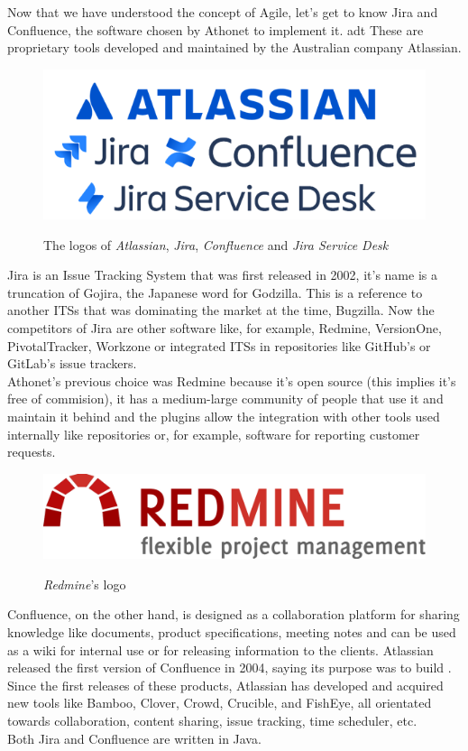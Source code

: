 	Now that we have understood the concept of Agile, let's get to know Jira and Confluence, the software chosen by Athonet to implement it. \gls{adt}
	These are proprietary tools developed and maintained by the Australian company Atlassian.
	\begin{figure}[H]
		\centering
		\includegraphics[width=.7\textwidth]{resources/atlassian_logo}\\
		\caption{The logos of \textit{Atlassian}, \textit{Jira}, \textit{Confluence} and \textit{Jira Service Desk}}
	\end{figure}
	Jira is an Issue Tracking System that was first released in 2002, it's name is a truncation of Gojira, the Japanese word for Godzilla.
	This is a reference to another ITSs that was dominating the market at the time, Bugzilla.
	Now the competitors of Jira are other software like, for example, Redmine, VersionOne, PivotalTracker, Workzone or integrated ITSs in repositories like GitHub's or GitLab's issue trackers.\\
	Athonet's previous choice was Redmine because it's open source (this implies it's free of commision), it has a medium-large community of people that use it and maintain it behind and the plugins allow the integration with other tools used internally like repositories or, for example, software for reporting customer requests.
	\begin{figure}[H]
		\centering
		\includegraphics[width=.6\textwidth]{resources/redmine_logo}\\
		\caption{\textit{Redmine}'s logo}
	\end{figure}
	Confluence, on the other hand, is designed as a collaboration platform for sharing knowledge like documents, product specifications, meeting notes and can be used as a wiki for internal use or for releasing information to the clients.
	Atlassian released the first version of Confluence in 2004, saying its purpose was to build \cite{theserverside}.\\
	Since the first releases of these products, Atlassian has developed and acquired new tools like Bamboo, Clover, Crowd, Crucible, and FishEye, all orientated towards collaboration, content sharing, issue tracking, time scheduler, etc.\\
	Both Jira and Confluence are written in Java.

